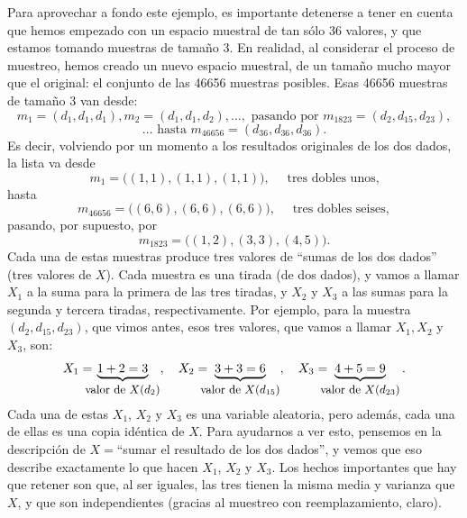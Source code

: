 \begin{ejemplo}
    Para aprovechar a fondo este ejemplo, es importante detenerse a tener en cuenta que hemos
    empezado con un espacio muestral de tan sólo 36 valores, y que estamos tomando muestras de
    tamaño 3. En realidad, al considerar el proceso de muestreo, hemos creado un nuevo espacio
    muestral, de un tamaño mucho mayor que el original: el conjunto de las 46656 muestras posibles.
    Esas 46656 muestras de tamaño 3 van desde:
    \[m_1=(d_1,d_1,d_1),m_2=(d_1,d_1,d_2),\ldots,\mbox{ pasando por }m_{1823}=(d_2,d_{15},d_{23}),\]\[\ldots\mbox{ hasta }m_{46656}=(d_{36},d_{36},d_{36}).\]
    Es decir, volviendo por un momento a los resultados originales de los dos dados, la lista va
    desde
    \[m_1=\bigl((1,1),(1,1),(1,1)\bigr), \quad{\mbox{ tres dobles unos,}}\]
    hasta
    \[m_{46656}=\bigl((6,6),(6,6),(6,6)\bigr), \quad{\mbox{ tres dobles seises},}\]
    pasando, por supuesto, por
    \[m_{1823}=\bigl((1,2), (3,3), (4,5)\bigr).\]
    Cada una de estas muestras produce tres valores de ``sumas de los dos dados'' (tres valores de
    $X$). Cada muestra es una tirada (de dos dados), y vamos a llamar $X_1$ a la suma para la
    primera de las tres tiradas, y $X_2$ y $X_3$ a las sumas para la segunda y tercera tiradas,
    respectivamente.  Por ejemplo, para la muestra $(d_2,d_{15},d_{23})$, que vimos antes, esos
    tres valores, que vamos a llamar $X_1, X_2$ y $X_3$, son:
        \[X_1=\hspace{-3mm}\underbrace{1+2=3}_{\mbox{\small valor de $X(d_2)$}},\quad X_2=\hspace{-3mm}\underbrace{3+3=6}_{\mbox{\small valor de $X(d_{15})$}},
        \quad X_3=\hspace{-3mm}\underbrace{4+5=9}_{\mbox{\small valor de $X(d_{23})$}}.\] Cada una
    de estas $X_1$, $X_2$ y  $X_3$ es una variable aleatoria, pero además, cada una de ellas es una
    copia idéntica de $X$. Para ayudarnos a ver esto, pensemos en la descripción de $X=$``sumar el
    resultado de los dos dados'', y vemos que eso describe exactamente lo que hacen $X_1$, $X_2$ y
    $X_3$. Los hechos importantes que hay que retener son que, al ser iguales, las tres tienen la
    misma media y varianza que $X$, y que son independientes (gracias al muestreo con
    reemplazamiento, claro).


%
%


\end{ejemplo}
